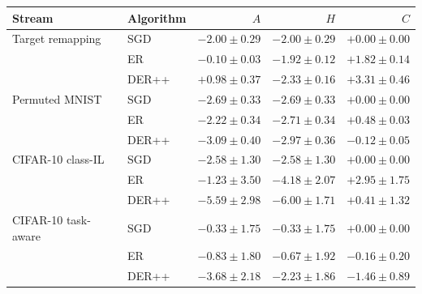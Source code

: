 \begin{tabular}{llrrr}
\toprule
Stream & Algorithm & $A$ & $H$ & $C$ \\
\midrule
Target remapping & SGD & $-2.00 \pm 0.29$ & $-2.00 \pm 0.29$ & $+0.00 \pm 0.00$ \\
 & ER & $-0.10 \pm 0.03$ & $-1.92 \pm 0.12$ & $+1.82 \pm 0.14$ \\
 & DER++ & $+0.98 \pm 0.37$ & $-2.33 \pm 0.16$ & $+3.31 \pm 0.46$ \\
\addlinespace
Permuted MNIST & SGD & $-2.69 \pm 0.33$ & $-2.69 \pm 0.33$ & $+0.00 \pm 0.00$ \\
 & ER & $-2.22 \pm 0.34$ & $-2.71 \pm 0.34$ & $+0.48 \pm 0.03$ \\
 & DER++ & $-3.09 \pm 0.40$ & $-2.97 \pm 0.36$ & $-0.12 \pm 0.05$ \\
\addlinespace
CIFAR-10 class-IL & SGD & $-2.58 \pm 1.30$ & $-2.58 \pm 1.30$ & $+0.00 \pm 0.00$ \\
 & ER & $-1.23 \pm 3.50$ & $-4.18 \pm 2.07$ & $+2.95 \pm 1.75$ \\
 & DER++ & $-5.59 \pm 2.98$ & $-6.00 \pm 1.71$ & $+0.41 \pm 1.32$ \\
\addlinespace
CIFAR-10 task-aware & SGD & $-0.33 \pm 1.75$ & $-0.33 \pm 1.75$ & $+0.00 \pm 0.00$ \\
 & ER & $-0.83 \pm 1.80$ & $-0.67 \pm 1.92$ & $-0.16 \pm 0.20$ \\
 & DER++ & $-3.68 \pm 2.18$ & $-2.23 \pm 1.86$ & $-1.46 \pm 0.89$ \\
\bottomrule
\end{tabular}

